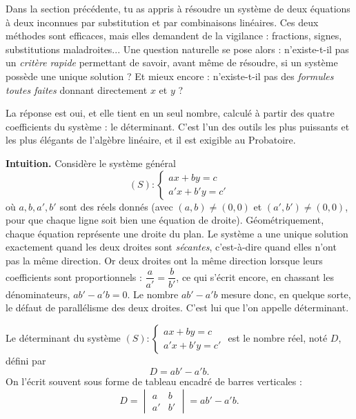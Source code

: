 \documentclass[11pt]{article}
\newcommand{\cle}[1]{{\popxbold\color{popdark}#1}}
\newcounter{popsec}
\newcounter{popsub}
\newcommand{\courssub}[1]{%
  \stepcounter{popsub}%
  \par\vspace{9pt}\noindent{\popxbold\fontsize{11.5}{13}\selectfont\color{popink}{\color{poporange}\thepopsec.\thepopsub}\hspace{6pt}#1}\par\nopagebreak\vspace{4pt}
}
\begin{document}
Dans la section précédente, tu as appris à résoudre un système de deux équations à deux inconnues par \cle{substitution} et par \cle{combinaisons linéaires}. Ces deux méthodes sont efficaces, mais elles demandent de la vigilance : fractions, signes, substitutions maladroites... Une question naturelle se pose alors : n'existe-t-il pas un \emph{critère rapide} permettant de savoir, avant même de résoudre, si un système possède une unique solution ? Et mieux encore : n'existe-t-il pas des \emph{formules toutes faites} donnant directement $x$ et $y$ ?

La réponse est oui, et elle tient en un seul nombre, calculé à partir des quatre coefficients du système : le \cle{déterminant}. C'est l'un des outils les plus puissants et les plus élégants de l'algèbre linéaire, et il est exigible au Probatoire.

\courssub{Le déterminant d'un système $2\times 2$}

\textbf{Intuition.} Considère le système général
\[
(S) : \begin{cases} ax + by = c \\ a'x + b'y = c' \end{cases}
\]
où $a, b, a', b'$ sont des réels donnés (avec $(a,b)\neq(0,0)$ et $(a',b')\neq(0,0)$, pour que chaque ligne soit bien une équation de droite). Géométriquement, chaque équation représente une droite du plan. Le système a une unique solution exactement quand les deux droites sont \emph{sécantes}, c'est-à-dire quand elles n'ont pas la même direction. Or deux droites ont la même direction lorsque leurs coefficients sont proportionnels : $\dfrac{a}{a'}=\dfrac{b}{b'}$, ce qui s'écrit encore, en chassant les dénominateurs, $ab'-a'b=0$. Le nombre $ab'-a'b$ mesure donc, en quelque sorte, le \og défaut de parallélisme \fg{} des deux droites. C'est lui que l'on appelle déterminant.

\begin{definition}
Le \cle{déterminant} du système $(S) : \begin{cases} ax + by = c \\ a'x + b'y = c' \end{cases}$ est le nombre réel, noté $D$, défini par
\[
D = ab' - a'b.
\]
On l'écrit souvent sous forme de tableau encadré de barres verticales :
\[
D = \begin{vmatrix} a & b \\ a' & b' \end{vmatrix} = ab' - a'b.
\]
\end{definition}
\end{document}
